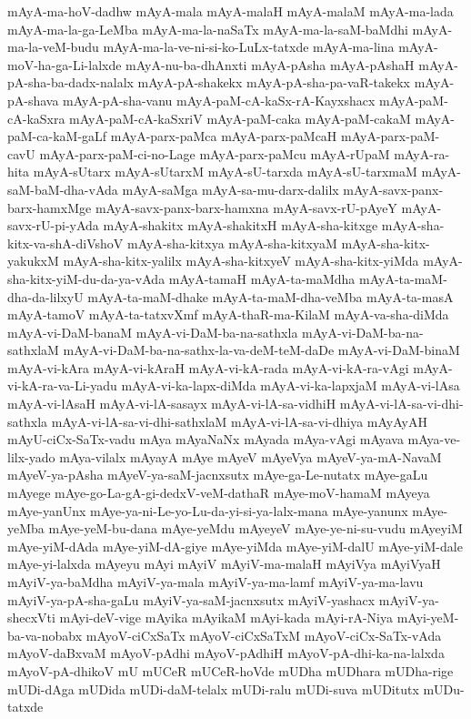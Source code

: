 {mAyA-ma-hoV-dadhw
mAyA-mala
mAyA-malaH
mAyA-malaM
mAyA-ma-lada
mAyA-ma-la-ga-LeMba
mAyA-ma-la-naSaTx
mAyA-ma-la-saM-baMdhi
mAyA-ma-la-veM-budu
mAyA-ma-la-ve-ni-si-ko-LuLx-tatxde
mAyA-ma-lina
mAyA-moV-ha-ga-Li-lalxde
mAyA-nu-ba-dhAnxti
mAyA-pAsha
mAyA-pAshaH
mAyA-pA-sha-ba-dadx-nalalx
mAyA-pA-shakekx
mAyA-pA-sha-pa-vaR-takekx
mAyA-pA-shava
mAyA-pA-sha-vanu
mAyA-paM-cA-kaSx-rA-Kayxshacx
mAyA-paM-cA-kaSxra
mAyA-paM-cA-kaSxriV
mAyA-paM-caka
mAyA-paM-cakaM
mAyA-paM-ca-kaM-gaLf
mAyA-parx-paMca
mAyA-parx-paMcaH
mAyA-parx-paM-cavU
mAyA-parx-paM-ci-no-Lage
mAyA-parx-paMcu
mAyA-rUpaM
mAyA-ra-hita
mAyA-sUtarx
mAyA-sUtarxM
mAyA-sU-tarxda
mAyA-sU-tarxmaM
mAyA-saM-baM-dha-vAda
mAyA-saMga
mAyA-sa-mu-darx-dalilx
mAyA-savx-panx-barx-hamxMge
mAyA-savx-panx-barx-hamxna
mAyA-savx-rU-pAyeY
mAyA-savx-rU-pi-yAda
mAyA-shakitx
mAyA-shakitxH
mAyA-sha-kitxge
mAyA-sha-kitx-va-shA-diVshoV
mAyA-sha-kitxya
mAyA-sha-kitxyaM
mAyA-sha-kitx-yakukxM
mAyA-sha-kitx-yalilx
mAyA-sha-kitxyeV
mAyA-sha-kitx-yiMda
mAyA-sha-kitx-yiM-du-da-ya-vAda
mAyA-tamaH
mAyA-ta-maMdha
mAyA-ta-maM-dha-da-lilxyU
mAyA-ta-maM-dhake
mAyA-ta-maM-dha-veMba
mAyA-ta-masA
mAyA-tamoV
mAyA-ta-tatxvXmf
mAyA-thaR-ma-KilaM
mAyA-va-sha-diMda
mAyA-vi-DaM-banaM
mAyA-vi-DaM-ba-na-sathxla
mAyA-vi-DaM-ba-na-sathxlaM
mAyA-vi-DaM-ba-na-sathx-la-va-deM-teM-daDe
mAyA-vi-DaM-binaM
mAyA-vi-kAra
mAyA-vi-kAraH
mAyA-vi-kA-rada
mAyA-vi-kA-ra-vAgi
mAyA-vi-kA-ra-va-Li-yadu
mAyA-vi-ka-lapx-diMda
mAyA-vi-ka-lapxjaM
mAyA-vi-lAsa
mAyA-vi-lAsaH
mAyA-vi-lA-sasayx
mAyA-vi-lA-sa-vidhiH
mAyA-vi-lA-sa-vi-dhi-sathxla
mAyA-vi-lA-sa-vi-dhi-sathxlaM
mAyA-vi-lA-sa-vi-dhiya
mAyAyAH
mAyU-ciCx-SaTx-vadu
mAya
mAyaNaNx
mAyada
mAya-vAgi
mAyava
mAya-ve-lilx-yado
mAya-vilalx
mAyayA
mAye
mAyeV
mAyeVya
mAyeV-ya-mA-NavaM
mAyeV-ya-pAsha
mAyeV-ya-saM-jacnxsutx
mAye-ga-Le-nutatx
mAye-gaLu
mAyege
mAye-go-La-gA-gi-dedxV-veM-dathaR
mAye-moV-hamaM
mAyeya
mAye-yanUnx
mAye-ya-ni-Le-yo-Lu-da-yi-si-ya-lalx-mana
mAye-yanunx
mAye-yeMba
mAye-yeM-bu-dana
mAye-yeMdu
mAyeyeV
mAye-ye-ni-su-vudu
mAyeyiM
mAye-yiM-dAda
mAye-yiM-dA-giye
mAye-yiMda
mAye-yiM-dalU
mAye-yiM-dale
mAye-yi-lalxda
mAyeyu
mAyi
mAyiV
mAyiV-ma-malaH
mAyiVya
mAyiVyaH
mAyiV-ya-baMdha
mAyiV-ya-mala
mAyiV-ya-ma-lamf
mAyiV-ya-ma-lavu
mAyiV-ya-pA-sha-gaLu
mAyiV-ya-saM-jacnxsutx
mAyiV-yashacx
mAyiV-ya-shecxVti
mAyi-deV-vige
mAyika
mAyikaM
mAyi-kada
mAyi-rA-Niya
mAyi-yeM-ba-va-nobabx
mAyoV-ciCxSaTx
mAyoV-ciCxSaTxM
mAyoV-ciCx-SaTx-vAda
mAyoV-daBxvaM
mAyoV-pAdhi
mAyoV-pAdhiH
mAyoV-pA-dhi-ka-na-lalxda
mAyoV-pA-dhikoV
mU
mUCeR
mUCeR-hoVde
mUDha
mUDhara
mUDha-rige
mUDi-dAga
mUDida
mUDi-daM-telalx
mUDi-ralu
mUDi-suva
mUDitutx
mUDu-tatxde
}
